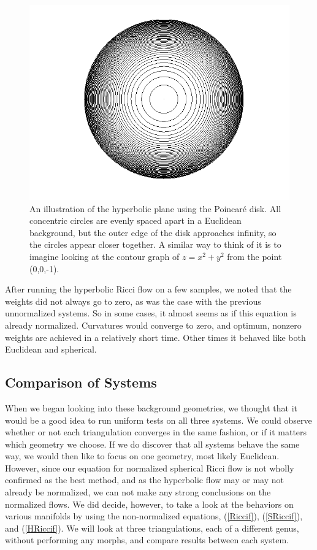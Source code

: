 \documentclass[12pt]{article}
\begin{document}
\begin{figure}
\centering
\includegraphics[scale = 0.5]{Pictures/pDisk.png}
\caption{An illustration of the hyperbolic plane using the Poincar\'{e} disk. All concentric circles are evenly spaced apart in a Euclidean background, but the outer edge of the disk approaches infinity, so the circles appear closer together. A similar way to think of it is to imagine looking at the contour graph of $z = x^2 + y^2$ from the point (0,0,-1).}
\label{PD}
\end{figure}

\noindent After running the hyperbolic Ricci flow on a few samples, we noted that the weights did not always go to zero, as was the case with the previous unnormalized systems. So in some cases, it almost seems as if this equation is already normalized. Curvatures would converge to zero, and optimum, nonzero weights are achieved in a relatively short time. Other times it behaved like both Euclidean and spherical. 

\subsection{Comparison of Systems}

When we began looking into these background geometries, we thought that it would be a good idea to run uniform tests on all three systems. We could observe whether or not each triangulation converges in the same fashion, or if it matters which geometry we choose. If we do discover that all systems behave the same way, we would then like to focus on one geometry, most likely Euclidean. However, since our equation for normalized spherical Ricci flow is not wholly confirmed as the best method, and as the hyperbolic flow may or may not already be normalized, we can not make any strong conclusions on the normalized flows. We did decide, however, to take a look at the behaviors on various manifolds by using the non-normalized equations, (\ref{Riccif}), (\ref{SRiccif}), and (\ref{HRiccif}). We will look at three triangulations, each of a different genus, without performing any morphs, and compare results between each system. \newline
\end{document}
